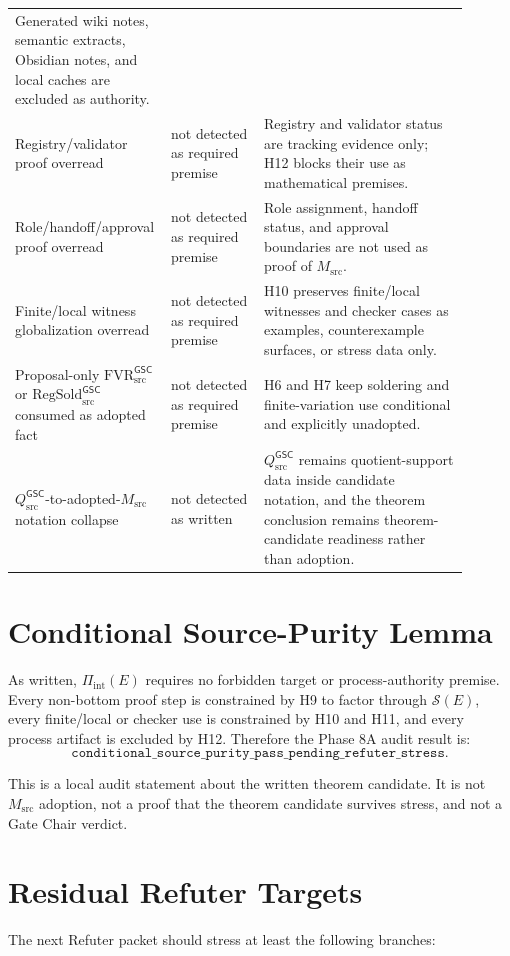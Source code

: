 \documentclass[11pt]{article}
\newcommand{\Msrc}{M_{\mathrm{src}}}
\newcommand{\Qsrc}{Q_{\mathrm{src}}^{\mathsf{GSC}}}
\newcommand{\RegSold}{\mathrm{RegSold}_{\mathrm{src}}^{\mathsf{GSC}}}
\newcommand{\FVR}{\mathrm{FVR}_{\mathrm{src}}^{\mathsf{GSC}}}
\newcommand{\SourceData}{\mathcal{S}(E)}
\begin{document}
\begin{longtable}{p{0.26\linewidth}p{0.20\linewidth}p{0.44\linewidth}}
Generated wiki notes, semantic extracts, Obsidian notes, and local caches are
excluded as authority. \\
Registry/validator proof overread & not detected as required premise &
Registry and validator status are tracking evidence only; H12 blocks their use
as mathematical premises. \\
Role/handoff/approval proof overread & not detected as required premise &
Role assignment, handoff status, and approval boundaries are not used as proof
of \(\Msrc\). \\
Finite/local witness globalization overread & not detected as required premise &
H10 preserves finite/local witnesses and checker cases as examples,
counterexample surfaces, or stress data only. \\
Proposal-only \(\FVR\) or \(\RegSold\) consumed as adopted fact & not detected
as required premise &
H6 and H7 keep soldering and finite-variation use conditional and explicitly
unadopted. \\
\(\Qsrc\)-to-adopted-\(\Msrc\) notation collapse & not detected as written &
\(\Qsrc\) remains quotient-support data inside candidate notation, and the
theorem conclusion remains theorem-candidate readiness rather than adoption. \\
\bottomrule
\end{longtable}

\section{Conditional Source-Purity Lemma}

As written, \(\Pi_{\mathrm{int}}(E)\) requires no forbidden target or
process-authority premise. Every non-bottom proof step is constrained by H9 to
factor through \(\SourceData\), every finite/local or checker use is constrained
by H10 and H11, and every process artifact is excluded by H12. Therefore the
Phase 8A audit result is:
\[
  \texttt{conditional\_source\_purity\_pass\_pending\_refuter\_stress}.
\]

This is a local audit statement about the written theorem candidate. It is not
\(\Msrc\) adoption, not a proof that the theorem candidate survives stress, and
not a Gate Chair verdict.

\section{Residual Refuter Targets}

The next Refuter packet should stress at least the following branches:
\end{document}
